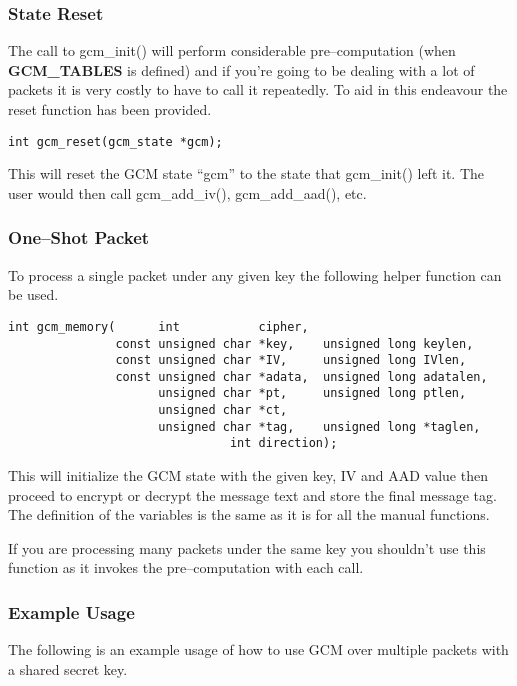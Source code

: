 \documentclass[a4paper]{book}
\begin{document}
\subsubsection{State Reset}
The call to gcm\_init() will perform considerable pre--computation (when \textbf{GCM\_TABLES} is defined) and if you're going to be dealing with a lot of packets
it is very costly to have to call it repeatedly.  To aid in this endeavour the reset function has been provided.

\begin{verbatim}
int gcm_reset(gcm_state *gcm);
\end{verbatim}

This will reset the GCM state ``gcm'' to the state that gcm\_init() left it.  The user would then call gcm\_add\_iv(), gcm\_add\_aad(), etc.

\subsubsection{One--Shot Packet}
To process a single packet under any given key the following helper function can be used.

\begin{verbatim}
int gcm_memory(      int           cipher,
               const unsigned char *key,    unsigned long keylen,
               const unsigned char *IV,     unsigned long IVlen,
               const unsigned char *adata,  unsigned long adatalen,
                     unsigned char *pt,     unsigned long ptlen,
                     unsigned char *ct, 
                     unsigned char *tag,    unsigned long *taglen,
                               int direction);
\end{verbatim}

This will initialize the GCM state with the given key, IV and AAD value then proceed to encrypt or decrypt the message text and store the final
message tag.  The definition of the variables is the same as it is for all the manual functions.

If you are processing many packets under the same key you shouldn't use this function as it invokes the pre--computation with each call.

\subsubsection{Example Usage}
The following is an example usage of how to use GCM over multiple packets with a shared secret key.
\end{document}
